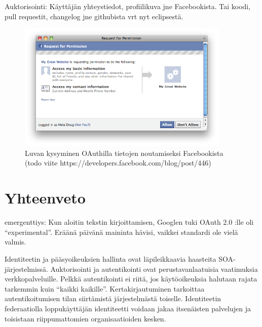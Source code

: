 \documentclass[finnish,gradu]{tktltiki}
\begin{document}
\begin{description}
  Auktorisointi: Käyttäjän yhteystiedot, profiilikuva jne Facebookista. Tai koodi, pull requestit, changelog jne githubista vrt nyt eclipsestä.

  \begin{figure}
    \centering
    \includegraphics[width=0.9\textwidth]{images/facebook_authorization_contact_info.png}
    \caption{Luvan kysyminen OAuthilla tietojen noutamiseksi Facebookista (todo viite https://developers.facebook.com/blog/post/446)}
    \label{fig:luvan_kysyminen_oauth_fb}
  \end{figure}

  \end{description}






\section{Yhteenveto} %
\label{sec:yhteenveto}

  emergenttiys: Kun aloitin tekstin kirjoittamisen, Googlen tuki OAuth 2.0 :lle oli ``experimental''. Eräänä päivänä maininta hävisi, vaikkei standardi ole vielä valmis. %

  Identiteetin ja pääsyoikeuksien hallinta ovat läpileikkaavia haasteita SOA-järjestelmissä.
  Auktorisointi ja autentikointi ovat perustavanlaatuisia vaatimuksia verkkopalveluille. Pelkkä autentikointi ei riitä, jos käytöoikeuksia halutaan rajata tarkemmin kuin ``kaikki kaikille''. Kertakirjautuminen tarkoittaa autentikoitumisen tilan siirtämistä järjestelmästä toiselle. Identiteetin federaatiolla loppukäyttäjän identiteetti voidaan jakaa itsenäisten palvelujen ja toisistaan riippumattomien organisaatioiden kesken.
\end{document}
